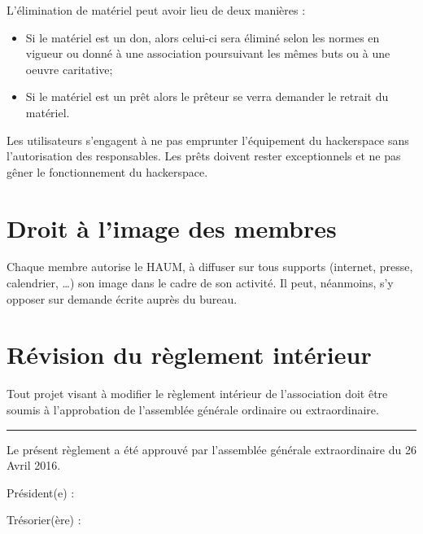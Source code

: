 \documentclass[a4paper, 11pt]{article}
\newcommand{\nomHS}{HAUM}
\newcommand\sep{\noindent\rule{\linewidth}{.5pt}}
\begin{document}
L'élimination de matériel peut avoir lieu de deux manières :

\begin{itemize}
    \item Si le matériel est un don, alors celui-ci sera éliminé selon les normes en vigueur ou donné à une association poursuivant les mêmes buts ou à une oeuvre caritative;
    \item Si le matériel est un prêt alors le prêteur se verra demander le retrait du matériel.
\end{itemize}

Les utilisateurs s'engagent à ne pas emprunter l'équipement du hackerspace sans l'autorisation des responsables. Les prêts doivent rester exceptionnels et ne pas gêner le fonctionnement du hackerspace.


\section{Droit à l'image des membres} %

Chaque membre autorise le \nomHS{}, à diffuser sur tous supports (internet, presse, calendrier, …) son image dans le cadre de son activité.  Il peut, néanmoins, s'y opposer sur demande écrite auprès du bureau.


\section{Révision du règlement intérieur} %

Tout projet visant à modifier le règlement intérieur de l'association doit être soumis à l'approbation de l'assemblée
générale ordinaire ou extraordinaire.

\bigskip\bigskip

\sep

\bigskip\bigskip

Le présent règlement a été approuvé par l'assemblée générale extraordinaire du 26 Avril 2016.

\bigskip\bigskip

Président(e) :


\bigskip\bigskip

Trésorier(ère) :
\end{document}
